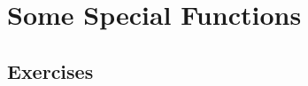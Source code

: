 \chapter{Some Special Functions}
\section{Exercises}
\setcounter{exercise}{6}

\setcounter{exercise}{29}

